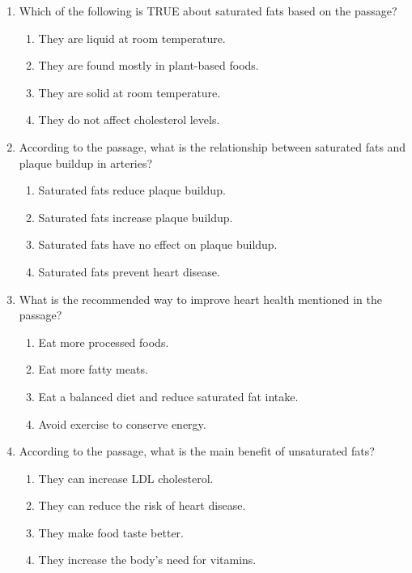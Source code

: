 \documentclass[12pt]{article}
\begin{document}
\begin{enumerate}
    \item Which of the following is TRUE about saturated fats based on the passage?
    \begin{enumerate}[label=\Alph*.]
        \item They are liquid at room temperature.
        \item They are found mostly in plant-based foods.
        \item They are solid at room temperature.
        \item They do not affect cholesterol levels.
    \end{enumerate}
    \vspace{0.5cm}

    \item According to the passage, what is the relationship between saturated fats and plaque buildup in arteries?
    \begin{enumerate}[label=\Alph*.]
        \item Saturated fats reduce plaque buildup.
        \item Saturated fats increase plaque buildup.
        \item Saturated fats have no effect on plaque buildup.
        \item Saturated fats prevent heart disease.
    \end{enumerate}
    \vspace{0.5cm}

    \item What is the recommended way to improve heart health mentioned in the passage?
    \begin{enumerate}[label=\Alph*.]
        \item Eat more processed foods.
        \item Eat more fatty meats.
        \item Eat a balanced diet and reduce saturated fat intake.
        \item Avoid exercise to conserve energy.
    \end{enumerate}
    \vspace{0.5cm}

    \item According to the passage, what is the main benefit of unsaturated fats?
    \begin{enumerate}[label=\Alph*.]
        \item They can increase LDL cholesterol.
        \item They can reduce the risk of heart disease.
        \item They make food taste better.
        \item They increase the body's need for vitamins.
    \end{enumerate}
    \vspace{0.5cm}


\end{enumerate}
\end{document}
